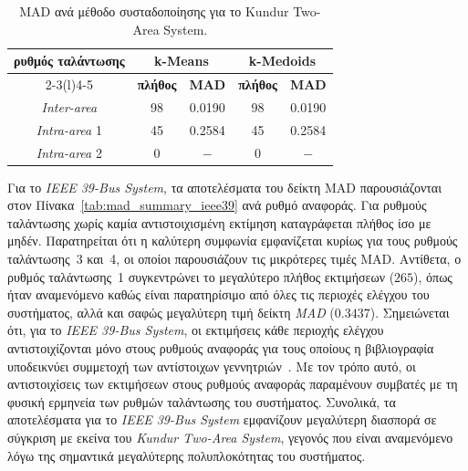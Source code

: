 \begin{table}[!t]
\centering
\caption{MAD ανά μέθοδο συσταδοποίησης για το Kundur Two-Area System.}
\label{tab:mad_summary_kundur}
\begin{tabular}{ccccc}
\toprule
\textbf{ρυθμός ταλάντωσης} & \multicolumn{2}{c}{\textbf{k-Means}} & \multicolumn{2}{c}{\textbf{k-Medoids}} \\
\cmidrule(lr){2-3}\cmidrule(l){4-5}
 & \textbf{πλήθος} & \textbf{MAD} & \textbf{πλήθος} & \textbf{MAD} \\
\midrule
\textenglish{\textit{Inter-area}}   & 98 & 0.0190 & 98 & 0.0190 \\
\textenglish{\textit{Intra-area}} 1 & 45 & 0.2584 & 45 & 0.2584 \\
\textenglish{\textit{Intra-area}} 2 & 0  & $-$     & 0  & $-$     \\
\bottomrule
\end{tabular}
\end{table}
\else
Για το \textenglish{\textit{IEEE 39-Bus System}}, τα αποτελέσματα του δείκτη MAD παρουσιάζονται στον
Πίνακα~\ref{tab:mad_summary_ieee39} ανά ρυθμό αναφοράς. Για ρυθμούς ταλάντωσης χωρίς καμία
αντιστοιχισμένη εκτίμηση καταγράφεται πλήθος ίσο με μηδέν. Παρατηρείται ότι η καλύτερη
συμφωνία εμφανίζεται κυρίως για τους ρυθμούς ταλάντωσης~3 και~4, οι οποίοι παρουσιάζουν τις μικρότερες τιμές MAD. Αντίθετα, ο ρυθμός ταλάντωσης~1 συγκεντρώνει το μεγαλύτερο πλήθος εκτιμήσεων ($265$), όπως ήταν αναμενόμενο καθώς είναι παρατηρίσιμο από όλες τις περιοχές ελέγχου του συστήματος, αλλά και σαφώς μεγαλύτερη τιμή δείκτη \textenglish{\textit{MAD}} ($0.3437$). Σημειώνεται ότι, για το \textenglish{\textit{IEEE 39-Bus System}}, οι εκτιμήσεις κάθε περιοχής ελέγχου αντιστοιχίζονται μόνο στους ρυθμούς αναφοράς για τους οποίους η βιβλιογραφία υποδεικνύει συμμετοχή των αντίστοιχων γεννητριών~\cite{sarkar2024drga}. Με τον τρόπο αυτό, οι αντιστοιχίσεις των εκτιμήσεων στους ρυθμούς αναφοράς παραμένουν συμβατές με τη φυσική ερμηνεία των ρυθμών ταλάντωσης του συστήματος.
Συνολικά, τα αποτελέσματα για το \textenglish{\textit{IEEE 39-Bus System}} εμφανίζουν μεγαλύτερη διασπορά σε σύγκριση με εκείνα του \textenglish{\textit{Kundur Two-Area System}}, γεγονός που είναι αναμενόμενο λόγω της σημαντικά μεγαλύτερης πολυπλοκότητας του συστήματος.

